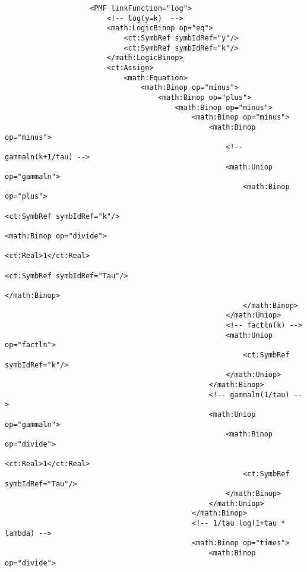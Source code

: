 \begin{lstlisting}
                    <PMF linkFunction="log">
                        <!-- log(y=k)  -->
                        <math:LogicBinop op="eq">
                            <ct:SymbRef symbIdRef="y"/>
                            <ct:SymbRef symbIdRef="k"/>
                        </math:LogicBinop>
                        <ct:Assign>
                            <math:Equation>
                                <math:Binop op="minus">
                                    <math:Binop op="plus">
                                        <math:Binop op="minus">
                                            <math:Binop op="minus">
                                                <math:Binop op="minus">
                                                    <!-- gammaln(k+1/tau) -->
                                                    <math:Uniop op="gammaln">
                                                        <math:Binop op="plus">
                                                            <ct:SymbRef symbIdRef="k"/>
                                                            <math:Binop op="divide">
                                                                <ct:Real>1</ct:Real>
                                                                <ct:SymbRef symbIdRef="Tau"/>
                                                            </math:Binop>
                                                        </math:Binop>
                                                    </math:Uniop>
                                                    <!-- factln(k) -->
                                                    <math:Uniop op="factln">
                                                        <ct:SymbRef symbIdRef="k"/>
                                                    </math:Uniop>
                                                </math:Binop>
                                                <!-- gammaln(1/tau) -->
                                                <math:Uniop op="gammaln">
                                                    <math:Binop op="divide">
                                                        <ct:Real>1</ct:Real>
                                                        <ct:SymbRef symbIdRef="Tau"/>
                                                    </math:Binop>
                                                </math:Uniop>
                                            </math:Binop>
                                            <!-- 1/tau log(1+tau * lambda) -->
                                            <math:Binop op="times">
                                                <math:Binop op="divide">

\end{lstlisting}
